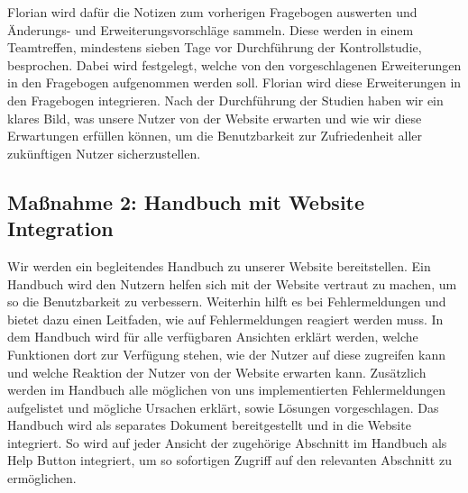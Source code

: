 \documentclass[accentcolor=tud0b,12pt,paper=a4]{tudreport}
\begin{document}
Florian wird dafür die Notizen zum vorherigen Fragebogen auswerten und Änderungs- und Erweiterungsvorschläge sammeln. Diese werden in einem Teamtreffen, mindestens sieben Tage vor Durchführung der Kontrollstudie, besprochen. Dabei wird festgelegt, welche von den vorgeschlagenen Erweiterungen in den Fragebogen aufgenommen werden soll. Florian wird diese Erweiterungen in den Fragebogen integrieren.
Nach der Durchführung der Studien haben wir ein klares Bild, was unsere Nutzer von der Website erwarten und wie wir diese Erwartungen erfüllen können, um die Benutzbarkeit zur Zufriedenheit aller zukünftigen Nutzer sicherzustellen.

\subsection{Maßnahme 2: Handbuch mit Website Integration}
Wir werden ein begleitendes Handbuch zu unserer Website bereitstellen. Ein Handbuch wird den Nutzern helfen sich mit der Website vertraut zu machen, um so die Benutzbarkeit zu verbessern. Weiterhin hilft es bei Fehlermeldungen und bietet dazu einen Leitfaden, wie auf Fehlermeldungen reagiert werden muss.
In dem Handbuch wird für alle verfügbaren Ansichten erklärt werden, welche Funktionen dort zur Verfügung stehen,  wie der Nutzer auf diese zugreifen kann und welche Reaktion der Nutzer von der Website erwarten kann. Zusätzlich werden im Handbuch alle möglichen von uns implementierten Fehlermeldungen aufgelistet und mögliche Ursachen erklärt, sowie Lösungen vorgeschlagen.
Das Handbuch wird als separates Dokument bereitgestellt und in die Website integriert. So wird auf jeder Ansicht der zugehörige Abschnitt im Handbuch als Help Button integriert, um so sofortigen Zugriff auf den relevanten Abschnitt zu ermöglichen.\\
\end{document}
